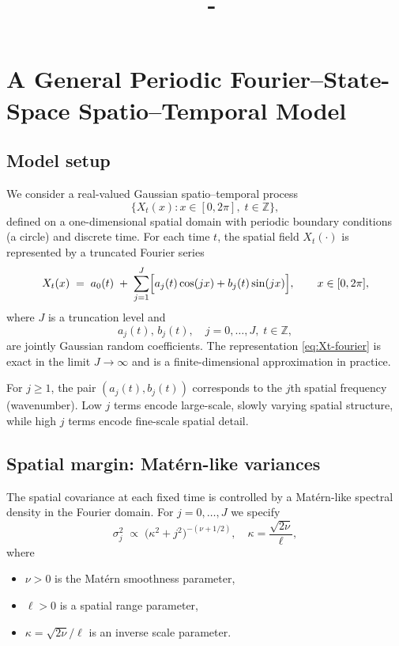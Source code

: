 \documentclass[answers,12pt,addpoints]{exam}
\author{\name}
\title{\course \ - \assignment}
\begin{document}
\maketitle

\section{A General Periodic Fourier--State-Space Spatio--Temporal Model}

\subsection{Model setup}

We consider a real-valued Gaussian spatio--temporal process
\[
  \{X_t(x) : x \in [0,2\pi],\; t \in \mathbb{Z}\},
\]
defined on a one-dimensional spatial domain with periodic boundary conditions (a circle) and discrete time. For each time $t$, the spatial field $X_t(\cdot)$ is represented by a truncated Fourier series
\begin{equation}
  X_t(x)
  \;=\;
  a_0(t)
  \;+\;
  \sum_{j=1}^{J}
    \Bigl[
      a_j(t)\cos(jx) + b_j(t)\sin(jx)
    \Bigr],
  \qquad x \in [0,2\pi],
  \label{eq:Xt-fourier}
\end{equation}
where $J$ is a truncation level and
\[
  a_j(t),\, b_j(t), \quad j=0,\dots,J,\; t\in\mathbb{Z},
\]
are jointly Gaussian random coefficients. The representation \eqref{eq:Xt-fourier} is exact in the limit $J\to\infty$ and is a finite-dimensional approximation in practice.

For $j \ge 1$, the pair $(a_j(t), b_j(t))$ corresponds to the $j$th spatial frequency (wavenumber). Low $j$ terms encode large-scale, slowly varying spatial structure, while high $j$ terms encode fine-scale spatial detail.

\subsection{Spatial margin: Matérn-like variances}

The spatial covariance at each fixed time is controlled by a Matérn-like spectral density in the Fourier domain. For $j = 0,\dots,J$ we specify
\begin{equation}
  \sigma_j^2
  \;\propto\;
  \bigl(\kappa^2 + j^2\bigr)^{-(\nu + 1/2)},
  \quad
  \kappa = \frac{\sqrt{2\nu}}{\ell},
  \label{eq:matern-spectrum}
\end{equation}
where
\begin{itemize}
  \item $\nu > 0$ is the Matérn smoothness parameter,
  \item $\ell > 0$ is a spatial range parameter,
  \item $\kappa = \sqrt{2\nu}/\ell$ is an inverse scale parameter.
\end{itemize}
\end{document}

